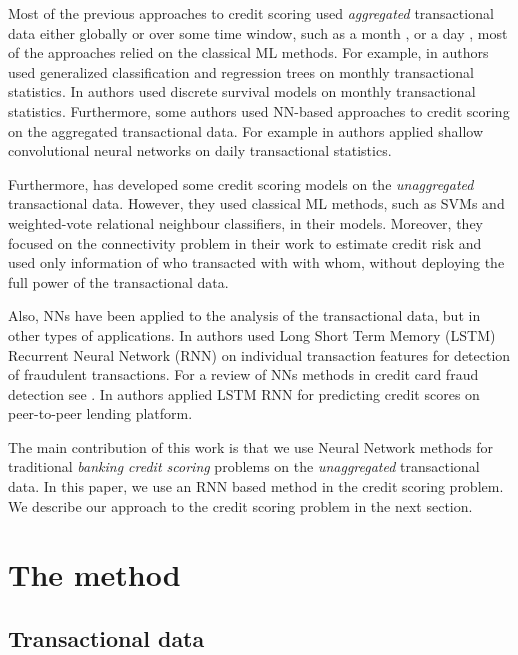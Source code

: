 \documentclass[sigconf]{acmart}
\begin{document}
Most of the previous approaches to credit scoring used {\em aggregated} transactional data either globally \cite{chi2012hybrid} or over some time window, such as a month \cite{khandani2010consumer}, \cite{bellotti2013forecasting} or a day \cite{KVAMME2018207}, most of the approaches relied on the classical ML methods. For example, in \cite{khandani2010consumer} authors used generalized classification and regression trees on monthly transactional statistics. In \cite{bellotti2013forecasting} authors used discrete survival models on monthly transactional statistics. Furthermore, some authors used NN-based approaches to credit scoring on the aggregated transactional data. For example in \cite{KVAMME2018207} authors applied shallow convolutional neural networks on daily transactional statistics. 

Furthermore, \cite{RePEc} has developed some credit scoring models on the {\em unaggregated} transactional data. However, they used classical ML methods, such as SVMs and weighted-vote relational neighbour classifiers, in their models. Moreover, they focused on the connectivity problem in their work to estimate credit risk and used only information of who transacted with with whom, without deploying the full power of the transactional data.

Also, NNs have been applied to the analysis of the transactional data, but in other types of applications. In \cite{fraud_lstm} authors used Long Short Term Memory (LSTM) Recurrent Neural Network (RNN) \cite{gers1999learning} on individual transaction features for detection of fraudulent transactions. For a review of NNs methods in credit card fraud detection see \cite{abdallah2016fraud}. In \cite{zhang2017credit}  authors applied LSTM RNN for predicting credit scores on peer-to-peer lending platform.

The main contribution of this work is that we use Neural Network methods for traditional {\em banking credit scoring} problems on the {\em unaggregated} transactional data. 
In this paper, we use an RNN based method in the credit scoring problem. We describe our approach to the credit scoring problem in the next section.

\section{The method}

\subsection{Transactional data}
\end{document}
